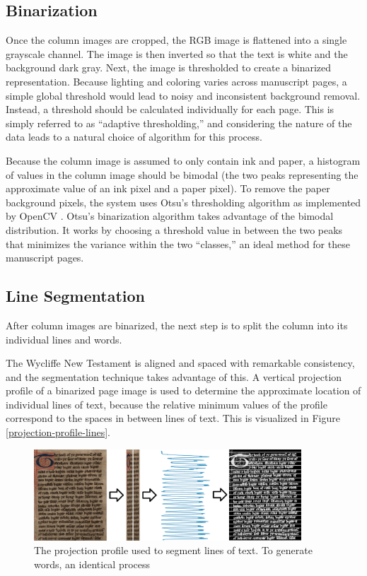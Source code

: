 \documentclass[final]{ukthesis}
\begin{document}
\subsection{Binarization}
Once the column images are cropped, the RGB image is flattened into a single grayscale channel. The image is then inverted so that the text is white and the background dark gray. Next, the image is thresholded to create a binarized representation. Because lighting and coloring varies across manuscript pages, a simple global threshold would lead to noisy and inconsistent background removal. Instead, a threshold should be calculated individually for each page. This is simply referred to as ``adaptive thresholding,'' and considering the nature of the data leads to a natural choice of algorithm for this process.

Because the column image is assumed to only contain ink and paper, a histogram of values in the column image should be bimodal (the two peaks representing the approximate value of an ink pixel and a paper pixel). To remove the paper background pixels, the system uses Otsu's thresholding algorithm \cite{otsu1979threshold} as implemented by OpenCV \cite{bradski2000opencv}. Otsu's binarization algorithm takes advantage of the bimodal distribution. It works by choosing a threshold value in between the two peaks that minimizes the variance within the two ``classes,'' an ideal method for these manuscript pages.


\subsection{Line Segmentation}
After column images are binarized, the next step is to split the column into its individual lines and words.

The Wycliffe New Testament is aligned and spaced with remarkable consistency, and the segmentation technique takes advantage of this. A vertical projection profile of a binarized page image is used to determine the approximate location of individual lines of text, because the relative minimum values of the profile correspond to the spaces in between lines of text. This is visualized in Figure \ref{projection-profile-lines}.

\begin{figure}[h]
\begin{center}
\includegraphics[width=10cm]{projection-profile-lines}
\end{center}
\caption{The projection profile used to segment lines of text. To generate words, an identical process}
\label{fig:projection-profile-lines}
\end{figure}
\end{document}

